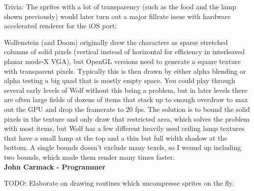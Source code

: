 \par

Trivia: The sprites with a lot of transparency (such as the food and the lamp shown previously) would later turn out a major fillrate issue with hardware accelerated renderer for the iOS port:

\begin{fancyquotes}
Wolfenstein (and Doom) originally drew the characters as sparse stretched columns of solid pixels (vertical instead of horizontal for efficiency in interleaved planar mode-X VGA), but OpenGL versions need to generate a square texture with transparent pixels.  Typically this is then drawn by either alpha blending or alpha testing a big quad that is mostly empty space.  You could play through several early levels of Wolf without this being a problem, but in later levels there are often large fields of dozens of items that stack up to enough overdraw to max out the GPU and drop the framerate to 20 fps.  The solution is to bound the solid pixels in the texture and only draw that restricted area, which solves the problem with most items, but Wolf has a few different heavily used ceiling lamp textures that have a small lamp at the top and a thin but full width shadow at the bottom.  A single bounds doesn't exclude many texels, so I wound up including two bounds, which made them render many times faster. 
\bigskip \\
\textbf{John Carmack - Programmer}
 \end{fancyquotes}

TODO: Elaborate on drawing routines which uncompresse sprites on the fly.



